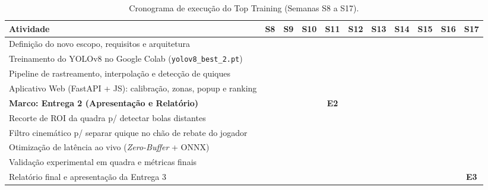 \documentclass[a4paper,11pt]{article}
\begin{document}
\begin{table}[H]
\centering
\scriptsize
\renewcommand{\arraystretch}{1.22}
\setlength{\tabcolsep}{3.5pt}
\caption{Cronograma de execução do Top Training (Semanas S8 a S17).}
\label{tab:gantt}
\begin{tabularx}{\textwidth}{X *{10}{c}}
\toprule
\textbf{Atividade} & \textbf{S8} & \textbf{S9} & \textbf{S10} & \textbf{S11} & \textbf{S12} & \textbf{S13} & \textbf{S14} & \textbf{S15} & \textbf{S16} & \textbf{S17} \\
\midrule
Definição do novo escopo, requisitos e arquitetura & \cellcolor{ganttgreen} & \cellcolor{ganttgreen} & & & & & & & & \\
\rowcolor{rowgray}
Treinamento do YOLOv8 no Google Colab (\texttt{yolov8\_best\_2.pt}) & & \cellcolor{ganttgreen} & \cellcolor{ganttgreen} & & & & & & & \\
Pipeline de rastreamento, interpolação e detecção de quiques & & & \cellcolor{ganttgreen} & \cellcolor{ganttgreen} & & & & & & \\
\rowcolor{rowgray}
Aplicativo Web (FastAPI + JS): calibração, zonas, popup e ranking & & & \cellcolor{ganttgreen} & \cellcolor{ganttgreen} & & & & & & \\
\textbf{Marco: Entrega 2 (Apresentação e Relatório)} & & & & \cellcolor{ganttorange}\textbf{E2} & & & & & & \\
\rowcolor{rowgray}
Recorte de ROI da quadra p/ detectar bolas distantes & & & & & \cellcolor{ganttblue} & \cellcolor{ganttblue} & & & & \\
Filtro cinemático p/ separar quique no chão de rebate do jogador & & & & & \cellcolor{ganttblue} & \cellcolor{ganttblue} & \cellcolor{ganttblue} & & & \\
\rowcolor{rowgray}
Otimização de latência ao vivo (\textit{Zero-Buffer} + ONNX) & & & & & & \cellcolor{ganttblue} & \cellcolor{ganttblue} & \cellcolor{ganttblue} & & \\
Validação experimental em quadra e métricas finais & & & & & & & & \cellcolor{ganttblue} & \cellcolor{ganttblue} & \\
\rowcolor{rowgray}
Relatório final e apresentação da Entrega 3 & & & & & & & & & \cellcolor{ganttblue} & \cellcolor{ganttgreen}\textbf{E3} \\
\bottomrule
\end{tabularx}
\end{table}
\end{document}
